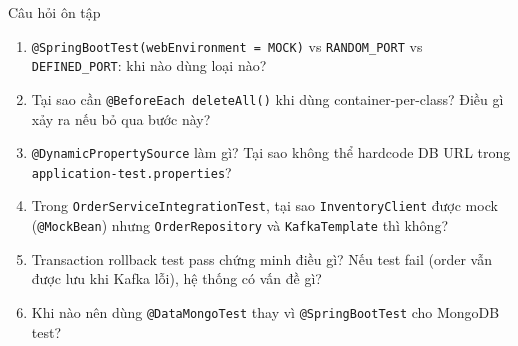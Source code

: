 \documentclass[aspectratio=169,10pt]{beamer}
\begin{document}
\begin{frame}{Câu hỏi ôn tập}
  \begin{enumerate}
    \item \texttt{@SpringBootTest(webEnvironment = MOCK)} vs
      \texttt{RANDOM\_PORT} vs \texttt{DEFINED\_PORT}:
      khi nào dùng loại nào?

    \item Tại sao cần \texttt{@BeforeEach deleteAll()} khi dùng
      container-per-class? Điều gì xảy ra nếu bỏ qua bước này?

    \item \texttt{@DynamicPropertySource} làm gì? Tại sao không thể
      hardcode DB URL trong \texttt{application-test.properties}?

    \item Trong \texttt{OrderServiceIntegrationTest}, tại sao
      \texttt{InventoryClient} được mock (\texttt{@MockBean}) nhưng
      \texttt{OrderRepository} và \texttt{KafkaTemplate} thì không?

    \item Transaction rollback test pass chứng minh điều gì?
      Nếu test fail (order vẫn được lưu khi Kafka lỗi), hệ thống
      có vấn đề gì?

    \item Khi nào nên dùng \texttt{@DataMongoTest} thay vì
      \texttt{@SpringBootTest} cho MongoDB test?
  \end{enumerate}
\end{frame}
\end{document}
